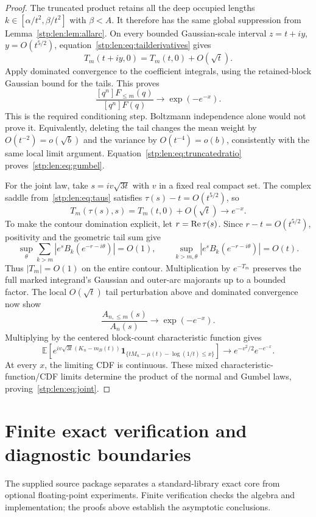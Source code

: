 \documentclass[11pt]{article}
\theoremstyle{remark}\newtheorem{remark}[theorem]{Remark}
\newcommand{\E}{\mathbb E}
\begin{document}
\begin{proof}
The truncated product retains all the deep occupied lengths $k\in[\alpha/t^2,\beta/t^2]$ with $\beta<A$. It therefore has the same global suppression from Lemma~\ref{stp:len:lem:allarc}. On every bounded Gaussian-scale interval $z=t+iy$, $y=O(t^{5/2})$, equation~\eqref{stp:len:eq:tailderivatives} gives
\[
 T_m(t+iy,0)=T_m(t,0)+O(\sqrt t).
\]
Apply dominated convergence to the coefficient integrals, using the retained-block Gaussian bound for the tails. This proves
\begin{equation}\label{stp:len:eq:truncatedratio}
 \frac{[q^n]F_{\le m}(q)}{[q^n]F(q)}\longrightarrow\exp(-e^{-x}).
\end{equation}
This is the required conditioning step. Boltzmann independence alone would not prove it. Equivalently, deleting the tail changes the mean weight by $O(t^{-2})=o(\sqrt b)$ and the variance by $O(t^{-4})=o(b)$, consistently with the same local limit argument. Equation~\eqref{stp:len:eq:truncatedratio} proves~\eqref{stp:len:eq:gumbel}.

For the joint law, take $s=iv\sqrt{3t}$ with $v$ in a fixed real compact set. The complex saddle from~\eqref{stp:len:eq:taus} satisfies $\tau(s)-t=O(t^{5/2})$, so
\[
 T_m(\tau(s),s)=T_m(t,0)+O(\sqrt t)\longrightarrow e^{-x}.
\]
To make the contour domination explicit, let $r=\operatorname{Re}\tau(s)$. Since $r-t=O(t^{5/2})$, positivity and the geometric tail sum give
\[
 \sup_\theta\sum_{k>m}|e^sB_k(e^{-r-i\theta})|=O(1),\qquad
 \sup_{k>m,\theta}|e^sB_k(e^{-r-i\theta})|=O(t).
\]
Thus $|T_m|=O(1)$ on the entire contour. Multiplication by $e^{-T_m}$ preserves the full marked integrand's Gaussian and outer-arc majorants up to a bounded factor. The local $O(\sqrt t)$ tail perturbation above and dominated convergence now show
\[
 \frac{A_{n,\le m}(s)}{A_n(s)}\longrightarrow\exp(-e^{-x}).
\]
Multiplying by the centered block-count characteristic function gives
\[
 \E\left[e^{iv\sqrt{3t}(K_n-m_B(t))}
       \mathbf1_{\{tM_n-\mu(t)-\log(1/t)\le x\}}\right]
 \longrightarrow e^{-v^2/2}e^{-e^{-x}}.
\]
At every $x$, the limiting CDF is continuous. These mixed characteristic-function/CDF limits determine the product of the normal and Gumbel laws, proving~\eqref{stp:len:eq:joint}.
\end{proof}

\section{Finite exact verification and diagnostic boundaries}\label{stp:len:sec:checks}
The supplied source package separates a standard-library exact core from optional floating-point experiments. Finite verification checks the algebra and implementation; the proofs above establish the asymptotic conclusions.
\end{document}
